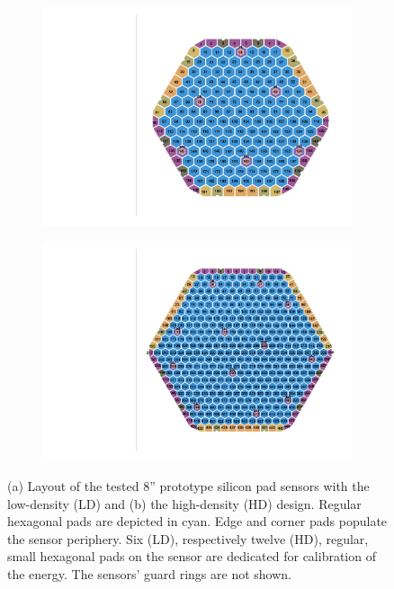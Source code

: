\begin{figure}
	\captionsetup[subfigure]{aboveskip=-1pt,belowskip=-1pt}
	\centering
	\begin{subfigure}[b]{0.50\textwidth}
		\includegraphics[width=0.999\textwidth]{plots/ch_mapping/LD.pdf}
		\subcaption{
		}
	\end{subfigure}
	\hfill
	\begin{subfigure}[b]{0.48\textwidth}
		\includegraphics[width=0.999\textwidth]{plots/ch_mapping/HD.pdf}
		\subcaption{
		}
	\end{subfigure}    
	\caption{
        (a) Layout of the tested 8'' prototype silicon pad sensors with the low-density (LD) and (b) the high-density (HD) design.
		Regular hexagonal pads are depicted in cyan. 
		Edge and corner pads populate the sensor periphery. 
		Six (LD), respectively twelve (HD), regular, small hexagonal pads on the sensor are dedicated for calibration of the energy.
		The sensors' guard rings are not shown.
	}
	\label{fig:Sensors}
\end{figure}
